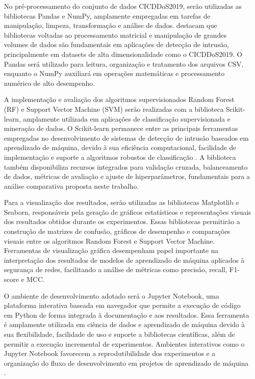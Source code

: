 \documentclass[
    12pt,                %
    openright,           %
    oneside,             %
    a4paper,             %
    english,             %
    brazil               %
]{abntex2}
\begin{document}
No pré-processamento do conjunto de dados CICDDoS2019, serão utilizadas as bibliotecas Pandas e NumPy, amplamente empregadas em tarefas de manipulação, limpeza, transformação e análise de dados.  destacam que bibliotecas voltadas ao processamento matricial e manipulação de grandes volumes de dados são fundamentais em aplicações de detecção de intrusão, principalmente em datasets de alta dimensionalidade como o CICDDoS2019. O Pandas será utilizado para leitura, organização e tratamento dos arquivos CSV, enquanto o NumPy auxiliará em operações matemáticas e processamento numérico de alto desempenho.

A implementação e avaliação dos algoritmos supervisionados Random Forest (RF) e Support Vector Machine (SVM) serão realizadas com a biblioteca Scikit-learn, amplamente utilizada em aplicações de classificação supervisionada e mineração de dados. O Scikit-learn permanece entre as principais ferramentas empregadas no desenvolvimento de sistemas de detecção de intrusão baseados em aprendizado de máquina, devido à sua eficiência computacional, facilidade de implementação e suporte a algoritmos robustos de classificação \cite{ScikitLearn2026}. A biblioteca também disponibiliza recursos integrados para validação cruzada, balanceamento de dados, métricas de avaliação e ajuste de hiperparâmetros, fundamentais para a análise comparativa proposta neste trabalho.

Para a visualização dos resultados, serão utilizadas as bibliotecas Matplotlib e Seaborn, responsáveis pela geração de gráficos estatísticos e representações visuais dos resultados obtidos durante os experimentos. Essas bibliotecas permitirão a construção de matrizes de confusão, gráficos de desempenho e comparações visuais entre os algoritmos Random Forest e Support Vector Machine. Ferramentas de visualização gráfica desempenham papel importante na interpretação dos resultados de modelos de aprendizado de máquina aplicados à segurança de redes, facilitando a análise de métricas como precisão, recall, F1-score e MCC.

O ambiente de desenvolvimento adotado será o Jupyter Notebook, uma plataforma interativa baseada em navegador que permite a execução de código em Python de forma integrada à documentação e aos resultados. Essa ferramenta é amplamente utilizada em ciência de dados e aprendizado de máquina devido à sua flexibilidade, facilidade de uso e suporte a bibliotecas científicas, além de permitir a execução incremental de experimentos. Ambientes interativos como o Jupyter Notebook favorecem a reprodutibilidade dos experimentos e a organização do fluxo de desenvolvimento em projetos de aprendizado de máquina \cite{JupyterDocs2026}.
\end{document}
